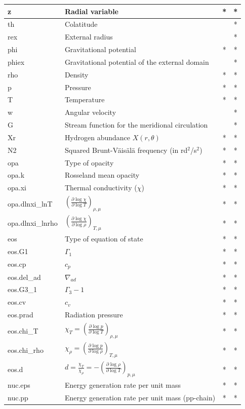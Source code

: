 \begin{longtable}{|l|p{8cm}|c|c|}
\hline
z&Radial variable&*&*\\
\hline
th&Colatitude&&*\\
\hline
rex&External radius&&*\\
\hline
phi&Gravitational potential&*&*\\
\hline
phiex&Gravitational potential of the external domain&&*\\
\hline
rho&Density&*&*\\
\hline
p&Pressure&*&*\\
\hline
T&Temperature&*&*\\
\hline
w&Angular velocity&&*\\
\hline
G&Stream function for the meridional circulation&&*\\
\hline
Xr&Hydrogen abundance $X(r,\theta)$&*&*\\
\hline
N2&Squared Brunt-V\"ais\"al\"a frequency (in rd$^2$/s$^2$)&*&*\\
\hline
opa&Type of opacity&*&*\\
\hline
opa.k&Rosseland mean opacity&*&*\\
\hline
opa.xi&Thermal conductivity ($\chi$)&*&*\\
\hline
opa.dlnxi\_lnT&$\left(\frac{\partial\log\chi}{\partial\log T}\right)_{\rho,\mu}$&*&*\\
\hline
opa.dlnxi\_lnrho&$\left(\frac{\partial\log\chi}{\partial\log\rho}\right)_{T,\mu}$&*&*\\
\hline
eos&Type of equation of state&*&*\\
\hline
eos.G1&$\Gamma_1$&*&*\\
\hline
eos.cp&$c_p$&*&*\\
\hline
eos.del\_ad&$\nabla_{ad}$&*&*\\
\hline
eos.G3\_1&$\Gamma_3-1$&*&*\\
\hline
eos.cv&$c_v$&*&*\\
\hline
eos.prad&Radiation pressure&*&*\\
\hline
eos.chi\_T&$\chi_T=\left(\frac{\partial\log p}{\partial\log T}\right)_{\rho,\mu}$&*&*\\
\hline
eos.chi\_rho&$\chi_\rho=\left(\frac{\partial\log p}{\partial\log\rho}\right)_{T,\mu}$&*&*\\
\hline
eos.d&$d=\frac{\chi_T}{\chi_\rho}=-\left(\frac{\partial\log\rho}{\partial\log T}\right)_{p,\mu}$&*&*\\
\hline
nuc.eps&Energy generation rate per unit mass&*&*\\
\hline
nuc.pp&Energy generation rate per unit mass (pp-chain)&*&*\\

\end{longtable}
